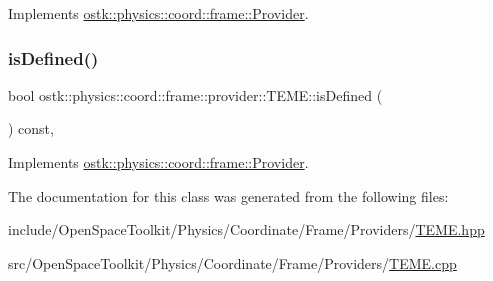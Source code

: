 Implements \hyperlink{classostk_1_1physics_1_1coord_1_1frame_1_1_provider_a38b86a589f46f8b8a9c97ab2776f37d1}{ostk\+::physics\+::coord\+::frame\+::\+Provider}.

\mbox{\label{classostk_1_1physics_1_1coord_1_1frame_1_1provider_1_1_t_e_m_e_a8a1c5599411f152c63b69819e89b0464}} 
\subsubsection{\texorpdfstring{is\+Defined()}{isDefined()}}
{\footnotesize\ttfamily bool ostk\+::physics\+::coord\+::frame\+::provider\+::\+T\+E\+M\+E\+::is\+Defined (\begin{DoxyParamCaption}{ }\end{DoxyParamCaption}) const\hspace{0.3cm}{\ttfamily [override]}, {\ttfamily [virtual]}}



Implements \hyperlink{classostk_1_1physics_1_1coord_1_1frame_1_1_provider_a27acab0012649796b97956fed1a91493}{ostk\+::physics\+::coord\+::frame\+::\+Provider}.



The documentation for this class was generated from the following files\+:\begin{DoxyCompactItemize}
\item 
include/\+Open\+Space\+Toolkit/\+Physics/\+Coordinate/\+Frame/\+Providers/\hyperlink{_t_e_m_e_8hpp}{T\+E\+M\+E.\+hpp}\item 
src/\+Open\+Space\+Toolkit/\+Physics/\+Coordinate/\+Frame/\+Providers/\hyperlink{_t_e_m_e_8cpp}{T\+E\+M\+E.\+cpp}\end{DoxyCompactItemize}
